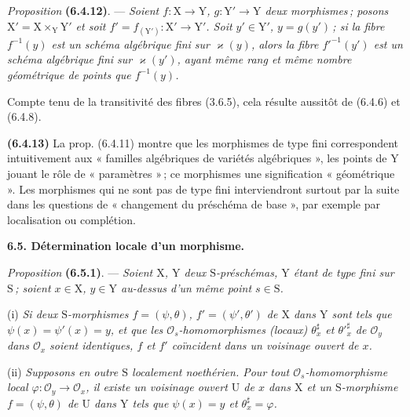 
\textit{Proposition} \textbf{(6.4.12)}. --- \textit{Soient $f:\mathrm{X}\to \mathrm{Y}$, $g:\mathrm{Y}'\to \mathrm{Y}$ deux morphismes\,; posons $\mathrm{X}'=\mathrm{X}\times_{\mathrm{Y}}\mathrm{Y}'$ et soit $f'=f_{(\mathrm{Y}')}:\mathrm{X}'\to \mathrm{Y}'$. Soit $y'\in \mathrm{Y}'$, $y=g(y')$\,; si la fibre $f^{-1}(y)$ est un schéma algébrique fini sur $\varkappa(y)$, alors la fibre ${f'}^{-1}(y')$ est un schéma algébrique fini sur $\varkappa(y')$, ayant même rang et même nombre géométrique de points que $f^{-1}(y)$.}

Compte tenu de la transitivité des fibres (3.6.5), cela résulte aussitôt de (6.4.6) et (6.4.8).

\textbf{(6.4.13)} La prop. (6.4.11) montre que les morphismes de type fini correspondent intuitivement aux « familles algébriques de variétés algébriques », les points de $\mathrm{Y}$ jouant le rôle de « paramètres »\,; ce   morphismes  une signification « géométrique ». \margin{\handwritten{$\times$}} Les morphismes qui ne sont pas de type fini interviendront surtout par la suite dans les questions de « changement du préschéma de base », par exemple par localisation ou complétion.

\textbf{6.5. Détermination locale d’un morphisme.}

\textit{Proposition} \textbf{(6.5.1)}. --- \textit{Soient $\mathrm{X}$, $\mathrm{Y}$ deux $\mathrm{S}$-préschémas, $\mathrm{Y}$ étant de type fini sur $\mathrm{S}$\,; soient $x\in \mathrm{X}$, $y\in \mathrm{Y}$ au-dessus d’un même point $s\in \mathrm{S}$.}

(i) \textit{Si deux $\mathrm{S}$-morphismes $f=(\psi,\theta)$, $f'=(\psi',\theta')$ de $\mathrm{X}$ dans $\mathrm{Y}$ sont tels que $\psi(x)=\psi'(x)=y$, et que les $\mathcal{O}_s$-homomorphismes (locaux) $\theta_x^{\sharp}$ et ${\theta'}^{\sharp}_x$ de $\mathcal{O}_y$ dans $\mathcal{O}_x$ soient identiques, $f$ et $f'$ coïncident dans un voisinage ouvert de $x$.}

(ii) \textit{Supposons en outre $\mathrm{S}$ localement noethérien. Pour tout $\mathcal{O}_s$-homomorphisme local $\varphi:\mathcal{O}_y\to\mathcal{O}_x$, il existe un voisinage ouvert $\mathrm{U}$ de $x$ dans $\mathrm{X}$ et un $\mathrm{S}$-morphisme $f=(\psi,\theta)$ de $\mathrm{U}$ dans $\mathrm{Y}$ tels que $\psi(x)=y$ et $\theta_x^{\sharp}=\varphi$.}


